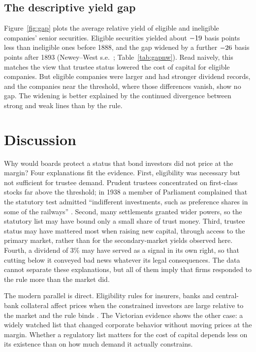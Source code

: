\documentclass[11pt]{article}
\begin{document}
\subsection{The descriptive yield gap}

Figure~\ref{fig:gap} plots the average relative yield of eligible and ineligible companies' senior securities. Eligible securities yielded about $-19$ basis points less than ineligible ones before 1888, and the gap widened by a further $-26$ basis points after 1893 (Newey--West s.e.\ \gapNW; Table~\ref{tab:gapnw}). Read naively, this matches the view that trustee status lowered the cost of capital for eligible companies. But eligible companies were larger and had stronger dividend records, and the companies near the threshold, where those differences vanish, show no gap. The widening is better explained by the continued divergence between strong and weak lines than by the rule.

\section{Discussion}\label{sec:discussion}

Why would boards protect a status that bond investors did not price at the margin? Four explanations fit the evidence. First, eligibility was necessary but not sufficient for trustee demand. Prudent trustees concentrated on first-class stocks far above the threshold; in 1938 a member of Parliament complained that the statutory test admitted ``indifferent investments, such as preference shares in some of the railways'' \citep{Hansard1938}. Second, many settlements granted wider powers, so the statutory list may have bound only a small share of trust money. Third, trustee status may have mattered most when raising new capital, through access to the primary market, rather than for the secondary-market yields observed here. Fourth, a dividend of 3\% may have served as a signal in its own right, so that cutting below it conveyed bad news whatever its legal consequences. The data cannot separate these explanations, but all of them imply that firms responded to the rule more than the market did.

The modern parallel is direct. Eligibility rules for insurers, banks and central-bank collateral affect prices when the constrained investors are large relative to the market and the rule binds \citep{KisgenStrahan2010, EllulJotikasthiraLundblad2011}. The Victorian evidence shows the other case: a widely watched list that changed corporate behavior without moving prices at the margin. Whether a regulatory list matters for the cost of capital depends less on its existence than on how much demand it actually constrains.
\end{document}
